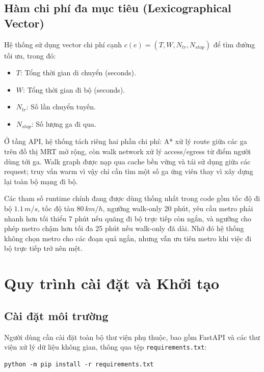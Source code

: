 ﻿\documentclass[../DoAn.tex]{subfiles}
\begin{document}
\subsection{Hàm chi phí đa mục tiêu (Lexicographical Vector)}
Hệ thống sử dụng vector chi phí cạnh $c(e) = (T, W, N_{tr}, N_{stop})$ để tìm đường tối ưu, trong đó:
\begin{itemize}
    \item $T$: Tổng thời gian di chuyển (seconds).
    \item $W$: Tổng thời gian đi bộ (seconds).
    \item $N_{tr}$: Số lần chuyển tuyến.
    \item $N_{stop}$: Số lượng ga đi qua.
\end{itemize}
Ở tầng API, hệ thống tách riêng hai phần chi phí: A* xử lý route giữa các ga trên đồ thị MRT mở rộng, còn walk network xử lý access/egress từ điểm người dùng tới ga. Walk graph được nạp qua cache bền vững và tái sử dụng giữa các request; truy vấn warm vì vậy chỉ cần tìm một số ga ứng viên thay vì xây dựng lại toàn bộ mạng đi bộ.

Các tham số runtime chính đang được dùng thống nhất trong code gồm tốc độ đi bộ \(1.1\,m/s\), tốc độ tàu \(80\,km/h\), ngưỡng walk-only 20 phút, yêu cầu metro phải nhanh hơn tối thiểu 7 phút nếu quãng đi bộ trực tiếp còn ngắn, và ngưỡng cho phép metro chậm hơn tối đa 25 phút nếu walk-only đã dài. Nhờ đó hệ thống không chọn metro cho các đoạn quá ngắn, nhưng vẫn ưu tiên metro khi việc đi bộ trực tiếp trở nên mệt.

\section{Quy trình cài đặt và Khởi tạo}
\subsection{Cài đặt môi trường}
Người dùng cần cài đặt toàn bộ thư viện phụ thuộc, bao gồm FastAPI và các thư viện xử lý dữ liệu không gian, thông qua tệp \texttt{requirements.txt}:
\begin{tcolorbox}[
  enhanced,
  title={Đoạn mã: Lệnh cài đặt phụ thuộc},
  fonttitle=\bfseries\small,
  colframe=codeframe,
  colback=codeback,
  coltitle=black,
  colbacktitle=codeheader,
  boxrule=0.5mm,
  arc=2mm,
  drop shadow,
  before=\par\vspace{8pt}\needspace{12\baselineskip},
  after=\par\vspace{10pt}
]
\begin{verbatim}
python -m pip install -r requirements.txt
\end{verbatim}
\end{tcolorbox}
\end{document}
